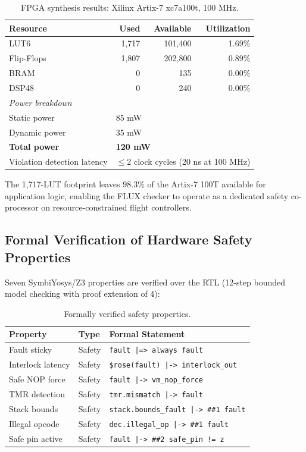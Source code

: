 \documentclass[sigplan,10pt,review]{acmart}
\begin{document}
\begin{table}[h]
\centering
\caption{FPGA synthesis results: Xilinx Artix-7 xc7a100t, 100 MHz.}
\label{tab:fpga}
\renewcommand{\arraystretch}{1.2}
\begin{tabular}{lrrr}
\toprule
\textbf{Resource} & \textbf{Used} & \textbf{Available} & \textbf{Utilization} \\
\midrule
LUT6              & 1,717  & 101,400 & 1.69\% \\
Flip-Flops        & 1,807  & 202,800 & 0.89\% \\
BRAM              & 0      & 135     & 0.00\% \\
DSP48             & 0      & 240     & 0.00\% \\
\midrule
\multicolumn{4}{l}{\textit{Power breakdown}} \\
\midrule
Static power      & \multicolumn{3}{l}{85 mW} \\
Dynamic power     & \multicolumn{3}{l}{35 mW} \\
\textbf{Total power}       & \multicolumn{3}{l}{\textbf{120 mW}} \\
\midrule
Violation detection latency & \multicolumn{3}{l}{$\leq$2 clock cycles (20 ns at 100 MHz)} \\
\bottomrule
\end{tabular}
\end{table}

The 1,717-LUT footprint leaves 98.3\% of the Artix-7 100T available for
application logic, enabling the FLUX checker to operate as a dedicated safety
co-processor on resource-constrained flight controllers.

\subsection{Formal Verification of Hardware Safety Properties}

Seven SymbiYosys/Z3 properties are verified over the RTL (12-step bounded model
checking with proof extension of 4):

\begin{table}[h]
\centering
\caption{Formally verified safety properties.}
\label{tab:formal}
\renewcommand{\arraystretch}{1.2}
\begin{tabular}{lll}
\toprule
\textbf{Property} & \textbf{Type} & \textbf{Formal Statement} \\
\midrule
Fault sticky & Safety & \texttt{fault |=> always fault} \\
Interlock latency & Safety & \texttt{\$rose(fault) |-> interlock\_out} \\
Safe NOP force & Safety & \texttt{fault |-> vm\_nop\_force} \\
TMR detection & Safety & \texttt{tmr.mismatch |-> fault} \\
Stack bounds & Safety & \texttt{stack.bounds\_fault |-> \#\#1 fault} \\
Illegal opcode & Safety & \texttt{dec.illegal\_op |-> \#\#1 fault} \\
Safe pin active & Safety & \texttt{fault |-> \#\#2 safe\_pin != z} \\
\bottomrule
\end{tabular}
\end{table}
\end{document}
